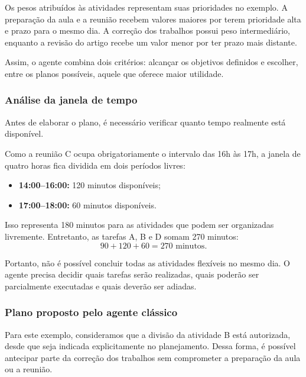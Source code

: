 \documentclass[12pt, a4paper]{article}
\begin{document}
Os pesos atribuídos às atividades representam suas prioridades no exemplo. A preparação da aula e a reunião recebem valores maiores por terem prioridade alta e prazo para o mesmo dia. A correção dos trabalhos possui peso intermediário, enquanto a revisão do artigo recebe um valor menor por ter prazo mais distante.

Assim, o agente combina dois critérios: alcançar os objetivos definidos e escolher, entre os planos possíveis, aquele que oferece maior utilidade.

\subsubsection{Análise da janela de tempo}

Antes de elaborar o plano, é necessário verificar quanto tempo realmente está disponível.

Como a reunião C ocupa obrigatoriamente o intervalo das 16h às 17h, a janela de quatro horas fica dividida em dois períodos livres:
\begin{itemize}[leftmargin=2em]
  \item \textbf{14:00--16:00:} 120 minutos disponíveis;
  \item \textbf{17:00--18:00:} 60 minutos disponíveis.
\end{itemize}

Isso representa 180 minutos para as atividades que podem ser organizadas livremente. Entretanto, as tarefas A, B e D somam 270 minutos:
\begin{equation}
90 + 120 + 60 = 270 \text{ minutos}.
\end{equation}

Portanto, não é possível concluir todas as atividades flexíveis no mesmo dia. O agente precisa decidir quais tarefas serão realizadas, quais poderão ser parcialmente executadas e quais deverão ser adiadas.

\subsubsection{Plano proposto pelo agente clássico}

Para este exemplo, consideramos que a divisão da atividade B está autorizada, desde que seja indicada explicitamente no planejamento. Dessa forma, é possível antecipar parte da correção dos trabalhos sem comprometer a preparação da aula ou a reunião.
\end{document}
